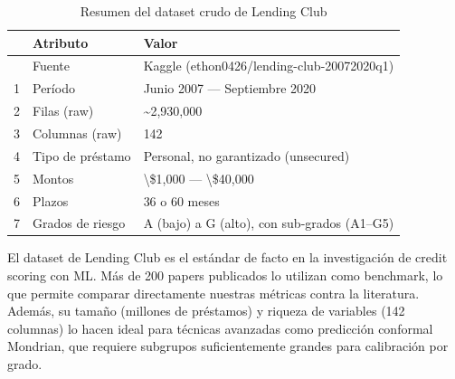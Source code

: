 \documentclass[
  spanish,
  11pt,
  letterpaper,
]{scrbook}
\theoremstyle{plain}
\theoremstyle{remark}
\begin{document}
{

\begin{longtable}[]{@{}lll@{}}

\caption{\label{tbl-dataset-overview}Resumen del dataset crudo de
Lending Club}

\tabularnewline

\toprule\noalign{}
& Atributo & Valor \\
\midrule\noalign{}
\endhead
\bottomrule\noalign{}
\endlastfoot
0 & Fuente & Kaggle (ethon0426/lending-club-20072020q1) \\
1 & Período & Junio 2007 --- Septiembre 2020 \\
2 & Filas (raw) & \textasciitilde2,930,000 \\
3 & Columnas (raw) & 142 \\
4 & Tipo de préstamo & Personal, no garantizado (unsecured) \\
5 & Montos & \textbackslash\$1,000 --- \textbackslash\$40,000 \\
6 & Plazos & 36 o 60 meses \\
7 & Grados de riesgo & A (bajo) a G (alto), con sub-grados (A1--G5) \\

\end{longtable}

}

\begin{tcolorbox}[enhanced jigsaw, arc=.35mm, bottomrule=.15mm, bottomtitle=1mm, breakable, colback=white, colbacktitle=quarto-callout-tip-color!10!white, colframe=quarto-callout-tip-color-frame, coltitle=black, left=2mm, leftrule=.75mm, opacityback=0, opacitybacktitle=0.6, rightrule=.15mm, title=\textcolor{quarto-callout-tip-color}{\faLightbulb}\hspace{0.5em}{¿Por qué Lending Club?}, titlerule=0mm, toprule=.15mm, toptitle=1mm]

El dataset de Lending Club es el estándar de facto en la investigación
de credit scoring con ML. Más de 200 papers publicados lo utilizan como
benchmark, lo que permite comparar directamente nuestras métricas contra
la literatura. Además, su tamaño (millones de préstamos) y riqueza de
variables (142 columnas) lo hacen ideal para técnicas avanzadas como
predicción conformal Mondrian, que requiere subgrupos suficientemente
grandes para calibración por grado.

\end{tcolorbox}
\end{document}
